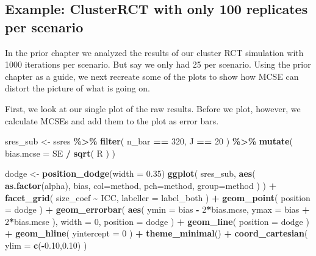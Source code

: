 \documentclass[
]{book}
\newenvironment{Shaded}{\begin{snugshade}}{\end{snugshade}}
\newcommand{\AttributeTok}[1]{\textcolor[rgb]{0.13,0.29,0.53}{#1}}
\newcommand{\DecValTok}[1]{\textcolor[rgb]{0.00,0.00,0.81}{#1}}
\newcommand{\FloatTok}[1]{\textcolor[rgb]{0.00,0.00,0.81}{#1}}
\newcommand{\FunctionTok}[1]{\textcolor[rgb]{0.13,0.29,0.53}{\textbf{#1}}}
\newcommand{\NormalTok}[1]{#1}
\newcommand{\OtherTok}[1]{\textcolor[rgb]{0.56,0.35,0.01}{#1}}
\newcommand{\SpecialCharTok}[1]{\textcolor[rgb]{0.81,0.36,0.00}{\textbf{#1}}}
\begin{document}
\subsection{Example: ClusterRCT with only 100 replicates per scenario}\label{example-clusterrct-with-only-100-replicates-per-scenario}

In the prior chapter we analyzed the results of our cluster RCT simulation with 1000 iterations per scenario.
But say we only had 25 per scenario.
Using the prior chapter as a guide, we next recreate some of the plots to show how MCSE can distort the picture of what is going on.

First, we look at our single plot of the raw results.
Before we plot, however, we calculate MCSEs and add them to the plot as error bars.

\begin{Shaded}
\begin{Highlighting}[]
\NormalTok{sres\_sub }\OtherTok{\textless{}{-}} 
\NormalTok{  ssres }\SpecialCharTok{\%\textgreater{}\%}
  \FunctionTok{filter}\NormalTok{( n\_bar }\SpecialCharTok{==} \DecValTok{320}\NormalTok{, J }\SpecialCharTok{==} \DecValTok{20}\NormalTok{ ) }\SpecialCharTok{\%\textgreater{}\%}
  \FunctionTok{mutate}\NormalTok{( }\AttributeTok{bias.mcse =}\NormalTok{ SE }\SpecialCharTok{/} \FunctionTok{sqrt}\NormalTok{( R ) )}

\NormalTok{dodge }\OtherTok{\textless{}{-}} \FunctionTok{position\_dodge}\NormalTok{(}\AttributeTok{width =} \FloatTok{0.35}\NormalTok{)}
\FunctionTok{ggplot}\NormalTok{( sres\_sub, }\FunctionTok{aes}\NormalTok{( }\FunctionTok{as.factor}\NormalTok{(alpha), bias, }
                       \AttributeTok{col=}\NormalTok{method, }\AttributeTok{pch=}\NormalTok{method, }\AttributeTok{group=}\NormalTok{method ) ) }\SpecialCharTok{+}
  \FunctionTok{facet\_grid}\NormalTok{( size\_coef }\SpecialCharTok{\textasciitilde{}}\NormalTok{ ICC, }\AttributeTok{labeller =}\NormalTok{ label\_both ) }\SpecialCharTok{+}
  \FunctionTok{geom\_point}\NormalTok{( }\AttributeTok{position =}\NormalTok{ dodge ) }\SpecialCharTok{+} 
  \FunctionTok{geom\_errorbar}\NormalTok{( }\FunctionTok{aes}\NormalTok{( }\AttributeTok{ymin =}\NormalTok{ bias }\SpecialCharTok{{-}} \DecValTok{2}\SpecialCharTok{*}\NormalTok{bias.mcse, }
                      \AttributeTok{ymax =}\NormalTok{ bias }\SpecialCharTok{+} \DecValTok{2}\SpecialCharTok{*}\NormalTok{bias.mcse ), }
                 \AttributeTok{width =} \DecValTok{0}\NormalTok{,}
                 \AttributeTok{position =}\NormalTok{ dodge ) }\SpecialCharTok{+}
  \FunctionTok{geom\_line}\NormalTok{( }\AttributeTok{position =}\NormalTok{ dodge ) }\SpecialCharTok{+}
  \FunctionTok{geom\_hline}\NormalTok{( }\AttributeTok{yintercept =} \DecValTok{0}\NormalTok{ ) }\SpecialCharTok{+}
  \FunctionTok{theme\_minimal}\NormalTok{() }\SpecialCharTok{+}
  \FunctionTok{coord\_cartesian}\NormalTok{( }\AttributeTok{ylim =} \FunctionTok{c}\NormalTok{(}\SpecialCharTok{{-}}\FloatTok{0.10}\NormalTok{,}\FloatTok{0.10}\NormalTok{) )}
\end{Highlighting}
\end{Shaded}
\end{document}
